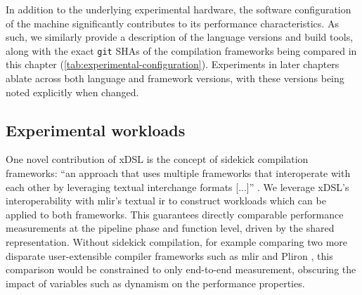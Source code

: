 In addition to the underlying experimental hardware, the software configuration of the machine significantly contributes to its performance characteristics.
As such, we similarly provide a description of the language versions and build tools, along with the exact \texttt{git} SHAs of the compilation frameworks being compared in this chapter (\autoref{tab:experimental-configuration}).
Experiments in later chapters ablate across both language and framework versions, with these versions being noted explicitly when changed.



\subsection{Experimental workloads}
\label{ssec:experimental-workloads}

One novel contribution of xDSL is the concept of sidekick compilation frameworks: ``an approach that uses multiple frameworks that interoperate with each other by leveraging textual interchange formats [...]'' \cite{fehrXDSLSidekickCompilation2025}.
We leverage xDSL's interoperability with \ac{mlir}'s textual \ac{ir} to construct workloads which can be applied to both frameworks.
This guarantees directly comparable performance measurements at the pipeline phase and function level, driven by the shared representation.
Without sidekick compilation, for example comparing two more disparate user-extensible compiler frameworks such as \ac{mlir} and Pliron \cite{vaivaswathanagarajVaivaswathaPliron2025}, this comparison would be constrained to only end-to-end measurement, obscuring the impact of variables such as dynamism on the performance properties.

